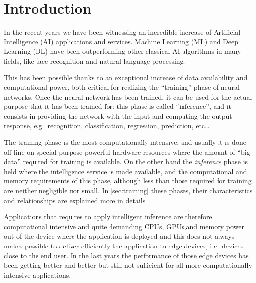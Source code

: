 \chapter{Introduction}\label{ch:introduction}
In the recent years we have been witnessing an incredible increase of
Artificial Intelligence (AI) applications and services.
Machine Learning (ML) and Deep Learning (DL) have been outperforming other
classical AI algorithms in many fields, like face recognition and natural
language processing.

This has been possible thanks to an exceptional increase of data availability
and computational power, both critical for realizing the ``training'' phase of
neural networks.
Once the neural network has been trained, it can be used for the actual purpose
that it has been trained for: this phase is called ``inference'', and it
consists in providing the network with the input and computing the output
response, e.g.\ recognition, classification, regression, prediction,
etc\ldots

The training phase is the most computationally intensive, and usually it is
done off-line on special purpose powerful hardware resources where the amount
of ``big data'' required for training is available. On the other hand the
\textit{inference} phase is held where the intelligence service is made
available, and the computational and memory requirements of this phase,
although less than those required for training are neither negligible nor
small.
In \autoref{sec:training} these phases, their characteristics and relationships
are explained more in details.

Applications that requires to apply intelligent inference are therefore
computational intensive and quite demanding CPUs, GPUs,and memory power out of
the device where the application is deployed and this does not always makes
possible to deliver efficiently the application to edge devices, i.e.\ devices
close to the end user.
In the last years the performance of those edge devices has been getting better
and better but still not sufficient for all more computationally intensive
applications.

